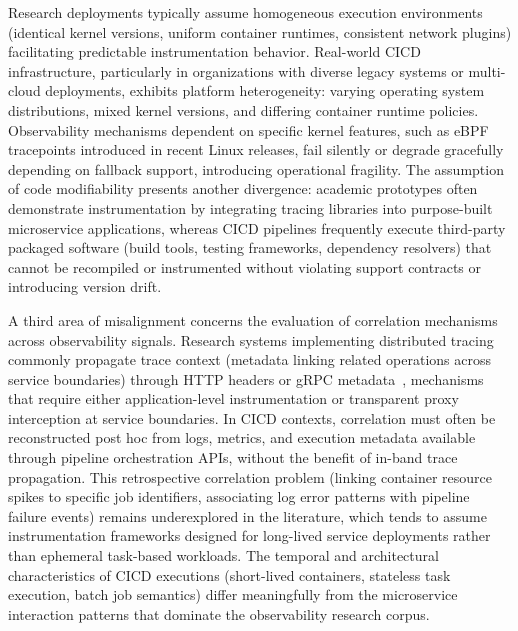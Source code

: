 Research deployments typically assume homogeneous execution environments (identical kernel versions, uniform container runtimes, consistent network plugins) facilitating predictable instrumentation behavior. Real-world \ac{CICD} infrastructure, particularly in organizations with diverse legacy systems or multi-cloud deployments, exhibits platform heterogeneity: varying operating system distributions, mixed kernel versions, and differing container runtime policies. Observability mechanisms dependent on specific kernel features, such as \gls{eBPF} tracepoints introduced in recent Linux releases, fail silently or degrade gracefully depending on fallback support, introducing operational fragility. The assumption of code modifiability presents another divergence: academic prototypes often demonstrate instrumentation by integrating tracing libraries into purpose-built microservice applications, whereas \ac{CICD} pipelines frequently execute third-party packaged software (build tools, testing frameworks, dependency resolvers) that cannot be recompiled or instrumented without violating support contracts or introducing version drift.

A third area of misalignment concerns the evaluation of correlation mechanisms across observability signals. Research systems implementing distributed tracing commonly propagate trace context (metadata linking related operations across service boundaries) through HTTP headers or gRPC metadata~\cite{sigelman2010dapper}, mechanisms that require either application-level instrumentation or transparent proxy interception at service boundaries. In \ac{CICD} contexts, correlation must often be reconstructed post hoc from logs, metrics, and execution metadata available through pipeline orchestration APIs, without the benefit of in-band trace propagation. This retrospective correlation problem (linking container resource spikes to specific job identifiers, associating log error patterns with pipeline failure events) remains underexplored in the literature, which tends to assume instrumentation frameworks designed for long-lived service deployments rather than ephemeral task-based workloads. The temporal and architectural characteristics of \ac{CICD} executions (short-lived containers, stateless task execution, batch job semantics) differ meaningfully from the microservice interaction patterns that dominate the observability research corpus.


